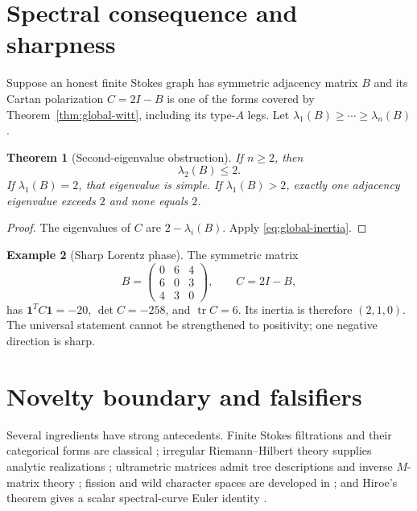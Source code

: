 \documentclass[11pt,a4paper]{amsart}
\theoremstyle{plain}
\newtheorem{theorem}{Theorem}[section]
\theoremstyle{definition}
\newtheorem{example}[theorem]{Example}
\newcommand{\one}{\mathbf 1}
\begin{document}
\section{Spectral consequence and sharpness}\label{sec:spectral}

Suppose an honest finite Stokes graph has symmetric adjacency matrix $B$ and its Cartan
polarization $C=2I-B$ is one of the forms covered by Theorem~\ref{thm:global-witt}, including its
type-$A$ legs.  Let
$\lambda_1(B)\geq\cdots\geq\lambda_n(B)$.

\begin{theorem}[Second-eigenvalue obstruction]\label{thm:lambda-two}
If $n\geq2$, then
\begin{equation}\label{eq:lambda-two}
                              \lambda_2(B)\leq2.
\end{equation}
If $\lambda_1(B)=2$, that eigenvalue is simple.  If $\lambda_1(B)>2$, exactly one adjacency
eigenvalue exceeds $2$ and none equals $2$.
\end{theorem}

\begin{proof}
The eigenvalues of $C$ are $2-\lambda_i(B)$.  Apply
\eqref{eq:global-inertia}.
\end{proof}

\begin{example}[Sharp Lorentz phase]\label{ex:triangle}
The symmetric matrix
\[
 B=\begin{pmatrix}0&6&4\\6&0&3\\4&3&0\end{pmatrix},\qquad
 C=2I-B,
\]
has $\one^TC\one=-20$, $\det C=-258$, and $\operatorname{tr}C=6$.  Its inertia is therefore
$(2,1,0)$.  The universal statement cannot be strengthened to positivity; one negative direction
is sharp.
\end{example}

\section{Novelty boundary and falsifiers}\label{sec:novelty}

Several ingredients have strong antecedents.  Finite Stokes filtrations and their categorical
forms are classical \cite{SabbahStokes}; irregular Riemann--Hilbert theory supplies analytic
realizations \cite{DKRH}; ultrametric matrices admit tree descriptions and inverse
$M$-matrix theory \cite{Martinez1994,McDonald1995,Nabben1995}; fission and wild character spaces
are developed in \cite{Boalch2014}; and Hiroe's theorem gives a scalar spectral-curve Euler
identity \cite{Hiroe2019}.
\end{document}
